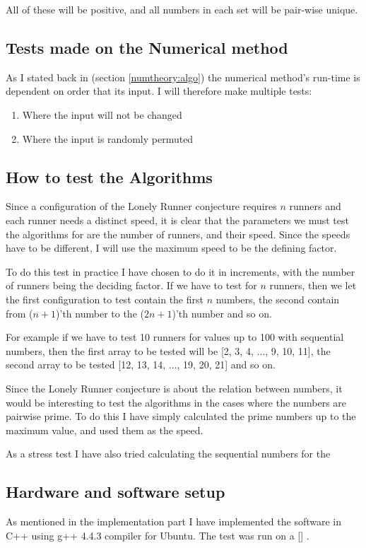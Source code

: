 All of these will be positive, and all numbers in each set will be
pair-wise unique.




\subsection{Tests made on the Numerical method}
As I stated back in (section \ref{numtheory:algo}) the numerical
method's run-time is dependent on order that its input. I will
therefore make multiple tests:
\begin{enumerate}
\item Where the input will not be changed
\item Where the input is randomly permuted
\end{enumerate} 

\subsection{How to test the Algorithms}
Since a configuration of the Lonely Runner conjecture requires $n$ runners and each runner needs a distinct speed, it is clear that the parameters we must test the algorithms for are the number of runners, and their speed. Since the speeds have to be different, I will use the maximum speed to be the defining factor.

To do this test in practice I have chosen to do it in increments, with the number of runners being the deciding factor. If we have to test for $n$ runners, then we let the first configuration to test contain the first $n$ numbers, the second contain from ($n+1$)'th number to the ($2n+1$)'th number and so on.

For example if we have to test 10 runners for values up to 100 with sequential numbers, then the first array to be tested will be [2, 3, 4, $\ldots$, 9, 10, 11], the second array to be tested [12, 13, 14, $\ldots$, 19, 20, 21] and so on.

Since the Lonely Runner conjecture is about the relation between numbers, it would be interesting to test the algorithms in the cases where the numbers are pairwise prime. To do this I have simply calculated the prime numbers up to the maximum value, and used them as the speed.

As a stress test I have also tried calculating the sequential numbers for the 

\subsection{Hardware and software setup}
As mentioned in the implementation part I have implemented the software in C++ using g++ 4.4.3 compiler for Ubuntu. The test was run on a [] .

